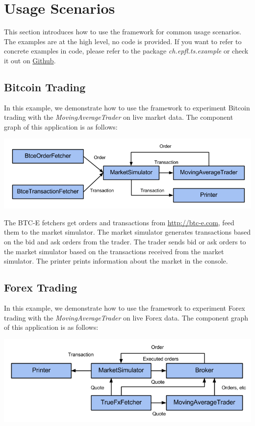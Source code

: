 
\section{Usage Scenarios}
\label{sec:3}

This section introduces how to use the framework for common usage scenarios. The examples are at the high level, no code is provided. If you want to refer to concrete examples in code, please refer to the package \emph{ch.epfl.ts.example} or check it out on \href{https://github.com/merlinND/TradingSimulation/tree/master/ts/src/main/scala/ch/epfl/ts/example}{Github}.

\subsection{Bitcoin Trading}

In this example, we demonstrate how to use the framework to experiment Bitcoin trading with the \emph{MovingAverageTrader} on live market data. The component graph of this application is as follows:

\noindent
\includegraphics[width=\textwidth]{img/examples/btce}

The BTC-E fetchers get orders and transactions from \url{http://btc-e.com}, feed them to the market simulator. The market simulator generates transactions based on the bid and ask orders from the trader. The trader sends bid or ask orders to the market simulator based on the transactions received from the market simulator. The printer prints information about the market in the console.

\subsection{Forex Trading}

In this example, we demonstrate how to use the framework to experiment Forex trading with the \emph{MovingAverageTrader} on live Forex data. The component graph of this application is as follows:

\noindent
\includegraphics[width=\textwidth]{img/examples/forex-live}

